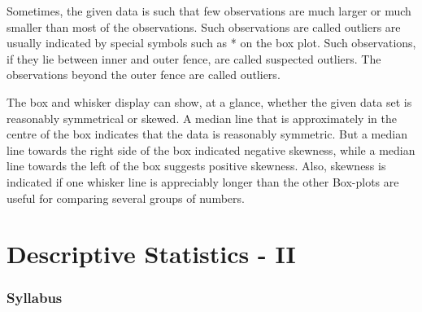 \documentclass[
10pt, %
a4paper, %
]{report}
\begin{document}
Sometimes, the given data is such that few observations are much larger or much smaller than most of the observations. Such observations are called outliers are usually indicated by special symbols such as * on the box plot. Such observations, if they lie between inner and outer fence, are called suspected outliers. The observations beyond the outer fence are called outliers.

The box and whisker display can show, at a glance, whether the given data set is reasonably symmetrical or skewed. A median line that is approximately in the centre of the box indicates that the data is reasonably symmetric. But a median line towards the right side of the box indicated negative skewness, while a median line towards the left of the box suggests positive skewness. Also, skewness is indicated if one whisker line is appreciably longer than the other Box-plots are useful for comparing several groups of numbers.




\part{Descriptive Statistics - II}

\section*{Syllabus}
\end{document}
